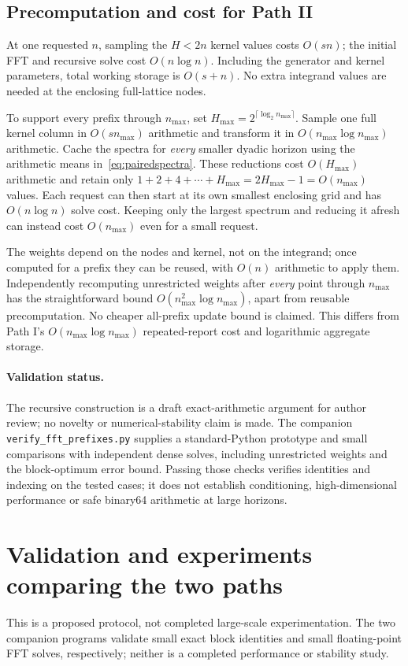 \documentclass[11pt]{article}
\begin{document}
\subsection{Precomputation and cost for Path II}\label{sec:fftcost}
At one requested $n$, sampling the $H<2n$ kernel values costs $O(sn)$;
the initial FFT and recursive solve cost $O(n\log n)$. Including
the generator and kernel parameters, total working storage is
$O(s+n)$. No extra integrand values are needed at the enclosing
full-lattice nodes.

To support every prefix through $n_{\max}$, set
$H_{\max}=2^{\lceil\log_2n_{\max}\rceil}$.
Sample one full kernel column in $O(sn_{\max})$ arithmetic and
transform it in $O(n_{\max}\log n_{\max})$ arithmetic.
Cache the spectra for \emph{every} smaller dyadic horizon using the
arithmetic means in~\eqref{eq:pairedspectra}. These reductions cost
$O(H_{\max})$ arithmetic and retain only
$1+2+4+\cdots+H_{\max}=2H_{\max}-1=O(n_{\max})$ values.
Each request can then start at its own smallest enclosing grid and
has $O(n\log n)$ solve cost. Keeping only the largest spectrum and
reducing it afresh can instead cost $O(n_{\max})$ even for a small request.

The weights depend on the nodes and kernel, not on the integrand;
once computed for a prefix they can be reused, with $O(n)$ arithmetic
to apply them. Independently recomputing unrestricted weights after
\emph{every} point through $n_{\max}$ has the straightforward bound
$O(n_{\max}^2\log n_{\max})$, apart from reusable precomputation.
No cheaper all-prefix update bound is claimed. This differs from
Path I's $O(n_{\max}\log n_{\max})$ repeated-report cost and
logarithmic aggregate storage.

\paragraph{Validation status.}
The recursive construction is a draft exact-arithmetic argument for
author review; no novelty or numerical-stability claim is made.
The companion \texttt{verify\_fft\_prefixes.py} supplies a standard-Python
prototype and small comparisons with independent dense solves,
including unrestricted weights and the block-optimum error bound.
Passing those checks verifies identities and indexing on the tested
cases; it does not establish conditioning, high-dimensional performance
or safe binary64 arithmetic at large horizons.

\section{Validation and experiments comparing the two paths}
This is a proposed protocol, not completed large-scale experimentation.
The two companion programs validate small exact block identities and
small floating-point FFT solves, respectively; neither is a completed
performance or stability study.
\end{document}
